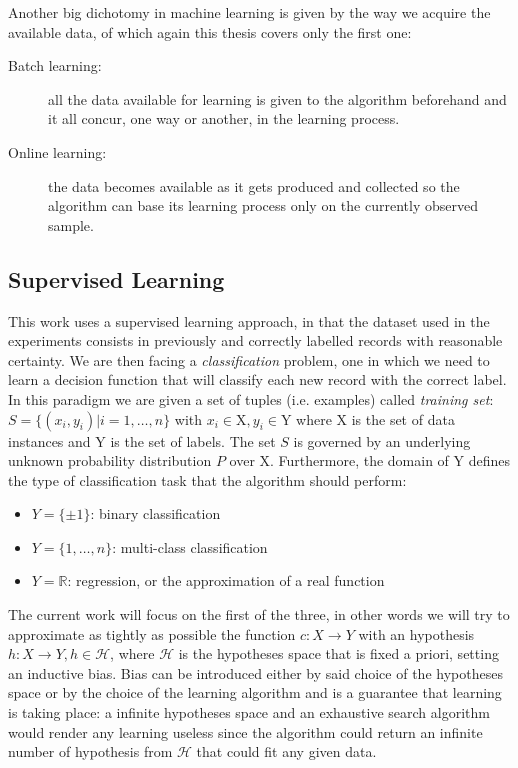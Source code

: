 Another big dichotomy in machine learning is given by the way we acquire the
available data, of which again this thesis covers only the first one:

\begin{description}
    \item [Batch learning:] all the data available for learning is given to the
        algorithm beforehand and it all concur, one way or another, in the
        learning process.
    \item [Online learning:] the data becomes available as it gets produced
        and collected so the algorithm can base its learning process only
        on the currently observed sample.
\end{description}

\subsection{Supervised Learning}

This work uses a supervised learning approach, in that the dataset
used in the experiments consists in previously and correctly labelled records with
reasonable certainty.
We are then facing a \emph{classification} problem, one in which we need to learn
a decision function that will classify each new record with the correct label.
In this paradigm we are given a set of tuples (i.e. examples) called \emph{training set}:
$S = \{(x_i, y_i)| i=1,\dots,n\}$ with $x_i \in \mathrm{X}, y_i \in \mathrm{Y}$
where $\mathrm{X}$ is the set of data instances and $\mathrm{Y}$ is the set of
labels.
The set $S$ is governed by an underlying unknown probability distribution $P$ over
$\mathrm{X}$.
Furthermore, the domain of $\mathrm{Y}$ defines the type of classification task
that the algorithm should perform:
\begin{itemize}
    \item $Y = \{\pm{1}\}$: binary classification
    \item $Y = \{1,\dots,n\}$: multi-class classification
    \item $Y = \mathbb{R}$: regression, or the approximation of a real function
\end{itemize}

The current work will focus on the first of the three, in other words we will
try to approximate as tightly as possible the function $c:X\to Y$ with an
hypothesis $h:X\to Y, h\in \mathcal{H}$, where $\mathcal{H}$ is the hypotheses
space that is fixed a priori, setting an inductive bias.
Bias can be introduced either by said choice of the hypotheses space or by the
choice of the learning algorithm and is a guarantee that learning is taking place:
a infinite hypotheses space and an exhaustive search algorithm would render
any learning useless since the algorithm could return an infinite number of
hypothesis from $\mathcal{H}$ that could fit any given data.

